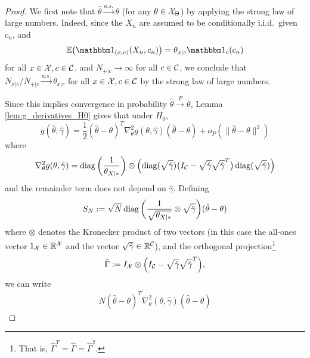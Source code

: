 \begin{proof}
  We first note that $\hat\theta \stackrel{a.s.}{\to} \theta$ (for any $\theta \in \mathcal{X}_\Theta$) by applying the strong law of large numbers.
  Indeed, since the $X_n$ are assumed to be conditionally i.i.d.\ given $c_n$, and 
    $$\Exp \big(\I_{(x,c)}(X_n,c_n)\big) = \theta_{x|c} \I_c(c_n)$$
  for all $x \in \mathcal{X}, c \in \mathcal{C}$, and $N_{+|c} \to \infty$ for all
  $c \in \mathcal{C}$, we conclude that $N_{x|c} / N_{+|c} \stackrel{a.s.}{\to} \theta_{x|c}$ 
  for all $x \in \mathcal{X}, c \in \mathcal{C}$
  by the strong law of large numbers.

  Since this implies convergence in probability $\hat\theta \stackrel{P}{\to} \theta$,
  Lemma \ref{lem:g_derivatives_H0} gives that under $H_0$,
  $$g(\hat\theta, \hat\gamma) = \frac{1}{2} (\hat\theta - \theta)^T \nabla_\theta^2 g(\theta,\hat\gamma) (\hat\theta - \theta) + o_P(\lVert\hat\theta - \theta\rVert^2)$$
  where
  $$\nabla^2_{\theta} g(\theta,\hat\gamma) = \operatorname*{\mathrm{diag}}\bigg(\frac{1}{\theta_{X|\ast}}\bigg) \otimes \left(\operatorname*{\mathrm{diag}}(\sqrt{\hat\gamma}) \big(I_{\mathcal{C}} - \sqrt{\hat\gamma} \sqrt{\hat\gamma}^T\big)\operatorname*{\mathrm{diag}}(\sqrt{\hat\gamma})\right)$$
  and the remainder term does not depend on $\hat\gamma$.
  Defining
  $$S_N := \sqrt{N} \operatorname*{\mathrm{diag}}\bigg(\frac{1}{\sqrt{\theta_{X|\ast}}} \otimes \sqrt{\hat\gamma}\bigg) (\hat\theta - \theta)$$
  where $\otimes$ denotes the Kronecker product of two vectors (in this case the all-ones vector $1_{\mathcal{X}} \in \mathbb{R}^{\mathcal{X}}$ and the vector $\sqrt{\hat\gamma} \in \mathbb{R}^{\mathcal{C}}$),
  and the orthogonal projection\footnote{That is, $\hat\Gamma^T = \hat\Gamma = \hat\Gamma^2$.}
  $$\hat\Gamma := I_{\mathcal{X}} \otimes \Big(I_{\mathcal{C}} - \sqrt{\hat\gamma} \sqrt{\hat\gamma}^T\Big),$$
  we can write
  \begin{equation*}\begin{split}
     N (\hat\theta - \theta)^T \nabla_\theta^2(\theta,\hat\gamma) (\hat\theta - \theta) 

\end{split}
\end{equation*}
\end{proof}
